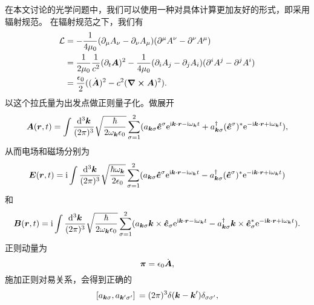 在本文讨论的光学问题中，我们可以使用一种对具体计算更加友好的形式，即采用辐射规范。
在辐射规范之下，我们有
\begin{equation}
    \begin{aligned}
        \mathcal{L} &= - \frac{1}{4 \mu_0} (\partial_\mu A_\nu - \partial_\nu A_\mu) (\partial^\mu A^\nu - \partial^\nu A^\mu) \\
        &= \frac{1}{2 \mu_0} \frac{1}{c^2} (\partial_t \vb*{A})^2 - \frac{1}{4\mu_0} (\partial_i A_j - \partial_j A_i) (\partial^i A^j - \partial^j A^i) \\
        &= \frac{\epsilon_0}{2} ((\dot{\vb*{A}})^2 - c^2 (\curl{\vb*{A}})^2).
    \end{aligned}
\end{equation}
以这个拉氏量为出发点做正则量子化。做展开
\begin{equation}
    \vb*{A}(\vb*{r}, t) = \int \frac{\dd[3]{\vb*{k}}}{(2\pi)^3} \sqrt{\frac{\hbar}{2 \omega_{\vb*{k}} \epsilon_0}} \sum_{\sigma=1}^2 (a_{\vb*{k} \sigma} \vu*{e}^\sigma \mathrm{e}^{\mathrm{i} \vb*{k} \cdot \vb*{r} - \mathrm{i} \omega_{\vb*{k}} t} + a^\dagger_{\vb*{k} \sigma} (\vu*{e}^\sigma)^* \mathrm{e}^{- \mathrm{i} \vb*{k} \cdot \vb*{r} + \mathrm{i} \omega_{\vb*{k}} t}),
\end{equation}
从而电场和磁场分别为
\begin{equation}
    \vb*{E}(\vb*{r}, t) = \mathrm{i} \int \frac{\dd[3]{\vb*{k}}}{(2\pi)^3} \sqrt{\frac{\hbar \omega_{\vb*{k}}}{2 \epsilon_0}} \sum_{\sigma=1}^2 (a_{\vb*{k} \sigma} \vu*{e}^\sigma \mathrm{e}^{\mathrm{i} \vb*{k} \cdot \vb*{r} - \mathrm{i} \omega_{\vb*{k}} t} - a^\dagger_{\vb*{k} \sigma} (\vu*{e}^\sigma)^* \mathrm{e}^{- \mathrm{i} \vb*{k} \cdot \vb*{r} + \mathrm{i} \omega_{\vb*{k}} t})
\end{equation}
和
\begin{equation}
    \vb*{B}(\vb*{r}, t) = \mathrm{i} \int \frac{\dd[3]{\vb*{k}}}{(2\pi)^3} \sqrt{\frac{\hbar}{2 \omega_{\vb*{k}} \epsilon_0}} \sum_{\sigma=1}^2 (a_{\vb*{k} \sigma} \vb*{k} \times \vu*{e}_\sigma \mathrm{e}^{\mathrm{i} \vb*{k} \cdot \vb*{r} - \mathrm{i} \omega_{\vb*{k}} t} - a^\dagger_{\vb*{k} \sigma} \vb*{k} \times \vu*{e}_\sigma^* \mathrm{e}^{- \mathrm{i} \vb*{k} \cdot \vb*{r} + \mathrm{i} \omega_{\vb*{k}} t}).
\end{equation}
正则动量为
\begin{equation}
    \vb*{\pi} = \epsilon_0 \dot{\vb*{A}},
\end{equation}
施加正则对易关系，会得到正确的
\begin{equation}
    \comm*{a_{\vb*{k} \sigma}}{a_{\vb*{k}' \sigma'}} = (2\pi)^3 \delta(\vb*{k} - \vb*{k}') \delta_{\sigma \sigma'},
\end{equation}
